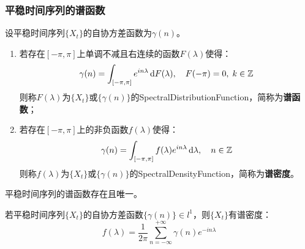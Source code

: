 \subsubsection{平稳时间序列的谱函数}
\begin{definition}
	设平稳时间序列$\{X_t\}$的自协方差函数为$\gamma(n)$。
	\begin{enumerate}
		\item 若存在$[-\pi,\pi]$上单调不减且右连续的函数$F(\lambda)$使得：
		\begin{equation*}
			\gamma(n)=\int_{[-\pi,\pi]}e^{in\lambda}\mathop{}\!\mathrm{d} F(\lambda),\quad F(-\pi)=0,\;k\in\mathbb{Z}
		\end{equation*}
		则称$F(\lambda)$为$\{X_t\}$或$\{\gamma(n)\}$的\gls{SpectralDistributionFunction}，简称为\textbf{谱函数}；
		\item 若存在$[-\pi,\pi]$上的非负函数$f(\lambda)$使得：
		\begin{equation*}
			\gamma(n)=\int_{[-\pi,\pi]}f(\lambda)e^{in\lambda}\mathop{}\!\mathrm{d}\lambda,\quad n\in\mathbb{Z}
		\end{equation*}
		则称$f(\lambda)$为$\{X_t\}$或$\{\gamma(n)\}$的\gls{SpectralDensityFunction}，简称为\textbf{谱密度}。
	\end{enumerate}
\end{definition}
\begin{theorem}
	平稳时间序列的谱函数存在且唯一。
\end{theorem}
\begin{theorem}\label{theo:SpectralGamma}
	若平稳时间序列$\{X_t\}$的自协方差函数$\{\gamma(n)\}\in l^1$，则$\{X_t\}$有谱密度：
	\begin{equation*}
		f(\lambda)=\frac{1}{2\pi}\sum_{n=-\infty}^{+\infty}\gamma(n)e^{-in\lambda}
	\end{equation*}
\end{theorem}
